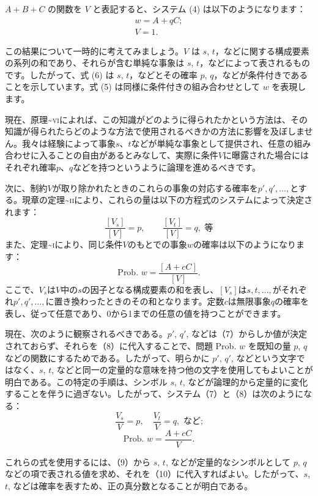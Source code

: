 \documentclass[a4paper,11pt,openany]{ltjsbook}
\begin{document}
\( A + B + C \) の関数を \( V \) と表記すると、システム (4) は以下のようになります：
\begin{gather}
w = A + qC;   \tag{5}   \\
V = 1.        \tag{6}
\end{gather}

この結果について一時的に考えてみましょう。\( V \) は \( s \), \( t \)，などに関する構成要素の系列の和であり、それらが含む単純な事象は \( s \), \( t \)，などによって表されるものです。したがって、式 (6) は \( s \), \( t \)，などとその確率 \( p \), \( q \)，などが条件付きであることを示しています。式 (5) は同様に条件付きの組み合わせとして \( w \) を表現します。

現在、原理\textasciitilde{}\textsc{vi}によれば、この知識がどのように得られたかという方法は、その知識が得られたらどのような方法で使用されるべきかの方法に影響を及ぼしません。我々は経験によって事象$s$、$t$などが単純な事象として提供され、任意の組み合わせに入ることの自由があるとみなして、実際に条件$V$に曝露された場合にはそれぞれ確率$p$、$q$などを持つというように論理を進めるべきです。

次に、制約$V$が取り除かれたときのこれらの事象の対応する確率を$p', q', \dotsc,$とする。現章の定理\textasciitilde{}\textsc{ii}により、これらの量は以下の方程式のシステムによって決定されます：
\[
  \frac{[V_s]}{[V]} = p, \qquad
  \frac{[V_t]}{[V]} = q, \text{ 等} \tag{7}
\]
また、定理\textasciitilde{}\textsc{i}により、同じ条件$V$のもとでの事象$w$の確率は以下のようになります：
\[
  \text{Prob. } w = \frac{[A + cC]}{[V]}. \tag{8}
\]
ここで、$V_s$は$V$中の$s$の因子となる構成要素の和を表し、$[V_s]$は$s, t, \dotsc,$がそれぞれ$p', q', \dotsc,$に置き換わったときのその和となります。定数$c$は無限事象$q$の確率を表し、従って任意であり、0から1までの任意の値を持つことができます。

現在、次のように観察されるべきである。$p'$, $q'$, などは（7）からしか値が決定されておらず、それらを（8）に代入することで、問題 Prob. $w$ を既知の量 $p$, $q$ などの関数にするためである。したがって、明らかに $p'$, $q'$, などという文字ではなく、$s$, $t$, などと同一の定量的な意味を持つ他の文字を使用してもよいことが明白である。この特定の手順は、シンボル $s$, $t$, などが論理的から定量的に変化することを伴うに過ぎない。したがって、システム（7）と（8）は次のようになる：
\[
  \frac{V_s}{V} = p, \quad
  \frac{V_t}{V} = q, \text{ など;} \tag{9}
\]
\[
  \text{Prob. } w = \frac{A + cC}{V}. \tag{10}
\]

これらの式を使用するには、（9）から $s$, $t$, などが定量的なシンボルとして $p$, $q$ などの項で表される値を求め、それを（10）に代入すればよい。したがって、$s$, $t$, などは確率を表すため、正の真分数となることが明白である。
\end{document}
